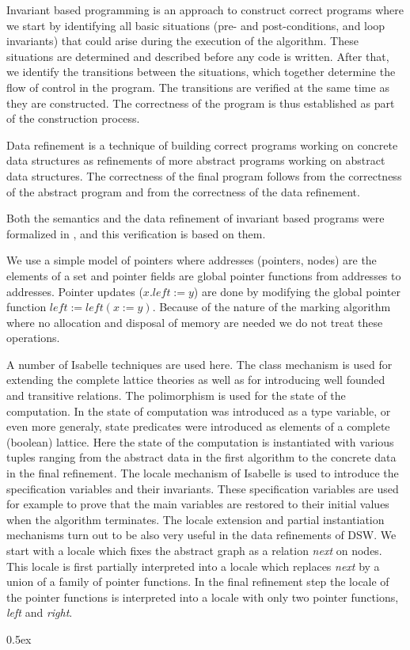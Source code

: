 \documentclass[11pt,a4paper]{article}
\begin{document}
Invariant based programming is an approach to construct correct programs 
where we start by identifying all basic situations (pre- and post-conditions, and loop 
invariants) that could arise during the execution of the algorithm. 
These situations are determined and described before any code is written. 
After that, we identify the transitions between the situations, which 
together determine the flow of control in the program. The transitions 
are verified at the same time as they are constructed. The correctness 
of the program is thus established as part of the construction process. 

Data refinement \cite{hoare:1972,back-1980,back:vonwright:2000,deroever:1999} 
is a technique of building correct programs working on concrete data structures 
as refinements of more abstract programs working on abstract data structures. 
The correctness of the final program follows from the correctness of the abstract 
program and from the correctness of the data refinement.

Both the semantics and the data refinement of invariant based programs were 
formalized in \cite{preoteasa:back:afp:2010}, and this verification is based on them.

We use a simple model of pointers where addresses (pointers, nodes) are 
the elements of a set and pointer fields are global pointer functions from
addresses to addresses. Pointer updates ($x.\mathit{left} := y$) are done
by modifying the global pointer function $\mathit{left} := \mathit{left}(x := y)$. 
Because of the nature of the marking algorithm where no allocation and 
disposal of memory are needed we do not treat these operations.

A number of Isabelle techniques are used here. The class mechanism is used
for extending the complete lattice theories as well as for introducing 
well founded and transitive relations. The polimorphism is used for the
state of the computation. In \cite{preoteasa:back:afp:2010} the state of computation 
was introduced as a type variable, or even more generaly, state predicates were introduced
as elements of a complete (boolean) lattice.
Here the state of the computation is instantiated with various tuples ranging
from the abstract data in the first algorithm to the concrete data
in the final refinement. The locale mechanism of Isabelle is used to
introduce the specification variables and their invariants. These
specification variables are used for example to prove that the main variables
are restored to their initial values when the algorithm terminates.
The locale extension and partial instantiation mechanisms turn out
to be also very useful in the data refinements of DSW. We start with
a locale which fixes the abstract graph as a relation {\em next} on
nodes. This locale is first partially interpreted into a locale
which replaces {\em next} by a union of a family of pointer functions. 
In the final refinement step the locale of the pointer functions is
interpreted into a locale with only two pointer functions, {\em left} and 
{\em right}.



\parindent 0pt\parskip 0.5ex





\end{document}
